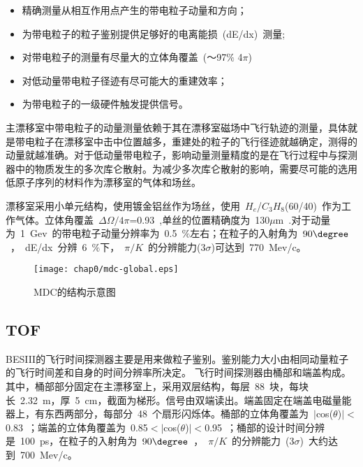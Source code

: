 \begin{itemize}
\item{精确测量从相互作用点产生的带电粒子动量和方向；}
\item{为带电粒子的粒子鉴别提供足够好的电离能损~(dE/dx)~测量;}
\item{对带电粒子的测量有尽量大的立体角覆盖~(～97$\%$ 4$\pi$)~}
\item{对低动量带电粒子径迹有尽可能大的重建效率；}
\item{为带电粒子的一级硬件触发提供信号。}
\end{itemize}


主漂移室中带电粒子的动量测量依赖于其在漂移室磁场中飞行轨迹的测量，具体就是带电粒子在漂移室中击中位置越多，重建处的粒子的飞行径迹就越确定，测得的动量就越准确。对于低动量带电粒子，影响动量测量精度的是在飞行过程中与探测器中的物质发生的多次库仑散射。为减少多次库仑散射的影响，需要尽可能的选用低原子序列的材料作为漂移室的气体和场丝。

漂移室采用小单元结构，使用镀金铝丝作为场丝，使用~$H_{e}$/$C_{3}H_{8}$(60/40)~作为工作气体。立体角覆盖~$\Delta\Omega/4\pi$=0.93~,单丝的位置精确度为~130$\mu$m~.对于动量为~1~Gev~的带电粒子动量分辨率为~0.5~$\%$左右；在粒子的入射角为~$90\degree$~，~dE/dx~分辨~6~$\%$下，~$\pi/K$~的分辨能力(3$\sigma$)可达到~770~Mev/c。
\begin{figure}[!h]
  \centering
  \texttt{[image: chap0/mdc-global.eps]}
  \caption{MDC的结构示意图}
  \label{fig:mdc-global}
\end{figure}

\subsection{TOF}
BESIII的飞行时间探测器主要是用来做粒子鉴别。鉴别能力大小由相同动量粒子的飞行时间差和自身的时间分辨率所决定。
飞行时间探测器由桶部和端盖构成。其中，桶部部分固定在主漂移室上，采用双层结构，每层~88~块，每块长~2.32~m，厚~5~cm，截面为梯形。信号由双端读出。端盖固定在端盖电磁量能器上，有东西两部分，每部分~48~个扇形闪烁体。桶部的立体角覆盖为~$|$cos($\theta$)$|<$0.83~；端盖的立体角覆盖为~0.85$<|$cos($\theta$)$|<$0.95~；桶部的设计时间分辨是~100~ps，在粒子的入射角为~$90\degree$~，~$\pi/K$~的分辨能力~(3$\sigma$)~大约达到~700~Mev/c。

